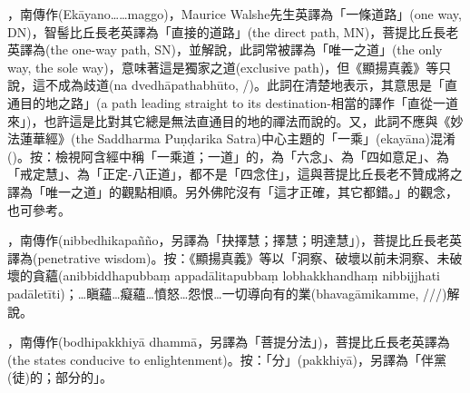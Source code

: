 \startitemgroup[noteitems]
\item{}，南傳作(Ekāyano……maggo)，Maurice Walshe先生英譯為「一條道路」(one way, DN)，智髻比丘長老英譯為「直接的道路」(the direct path, MN)，菩提比丘長老英譯為(the one-way path, SN)，並解說，此詞常被譯為「唯一之道」(the only way, the sole way)，意味著這是獨家之道(exclusive path)，但《顯揚真義》等只說，這不成為歧道(na dvedhāpathabhūto, /)。此詞在清楚地表示，其意思是「直通目的地之路」(a path leading straight to its destination-相當的譯作「直從一道來」)，也許這是比對其它總是無法直通目的地的禪法而說的。又，此詞不應與《妙法蓮華經》(the Saddharma Puṇḍarika Satra)中心主題的「一乘」(ekayāna)混淆()。按：檢視阿含經中稱「一乘道；一道」的，為「六念」、為「四如意足」、為「戒定慧」、為「正定-八正道」，都不是「四念住」，這與菩提比丘長老不贊成將之譯為「唯一之道」的觀點相順。另外佛陀沒有「這才正確，其它都錯。」的觀念，也可參考。
\stopitemgroup

\startitemgroup[noteitems]
\item{}，南傳作(nibbedhikapañño，另譯為「抉擇慧；擇慧；明達慧」)，菩提比丘長老英譯為(penetrative wisdom)。按：《顯揚真義》等以「洞察、破壞以前未洞察、未破壞的貪蘊(anibbiddhapubbaṃ appadālitapubbaṃ lobhakkhandhaṃ nibbijjhati padāletīti)；…瞋蘊…癡蘊…憤怒…怨恨…一切導向有的業(bhavagāmikamme, ///)解說。
\stopitemgroup

\startitemgroup[noteitems]
\item{}，南傳作(bodhipakkhiyā dhammā，另譯為「菩提分法」)，菩提比丘長老英譯為(the states conducive to enlightenment)。按：「分」(pakkhiyā)，另譯為「伴黨(徒)的；部分的」。
\stopitemgroup


